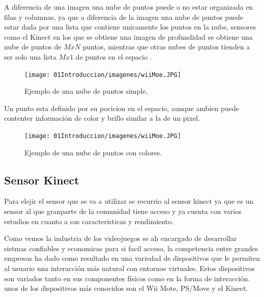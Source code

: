 A diferencia de una \gls{imagen} una nube de puntos puede o no estar organizada en filas y columnas, ya que a diferencia de la imagen una nube de puntos puede estar dada por una lista que contiene unicamente los puntos en la nube, sensores como el Kinect en los que se obtiene una imagen de profundidad se obtiene una nube de puntos de $MxN$ puntos, mientras que otras nubes de puntos tienden a ser solo una lista $Mx1$ de puntos en el espacio \cite{Rusu_ICRA2011_PCL}.\\
\begin{figure}[!htb]
	\centering
	\texttt{[image: 01Introduccion/imagenes/wiiMoe.JPG]}
	\caption{Ejemplo de una nube de puntos simple.} 
	\label{fig:nuveDePuntos}
\end{figure}

Un punto esta definido por su pocicion en el espacio, aunque ambien puede contenter información de color y brillo similar a la de un pixel.
\begin{figure}[!htb]
	\centering
	\texttt{[image: 01Introduccion/imagenes/wiiMoe.JPG]}
	\caption{Ejemplo de una nube de puntos con colores.} 
	\label{fig:nuveDePuntosRGB}
\end{figure}

\subsection{Sensor Kinect}

Para elejir el sensor que se va a utilizar se recurrio al sensor kinect ya que es un sensor al que granparte de la comunidad tiene acceso y ya cuenta con varios estudios en cuanto a sus caracteristicas y rendimiento.

Como vemos la industria de los videojuegos se ah encargado de desarrollar sistmas confiables y economicas para si facil acceso, la competencia entre grandes empresas ha dado como resultado en una variedad de dispositivos que le permiten al usuario una interacción más natural con entornos virtuales. Estos dispositivos son variados tanto en sus componentes físicos como en la forma de interacción. unos de los dispositivos más conocidos son el Wii Mote, PS/Move y el Kinect.\\

